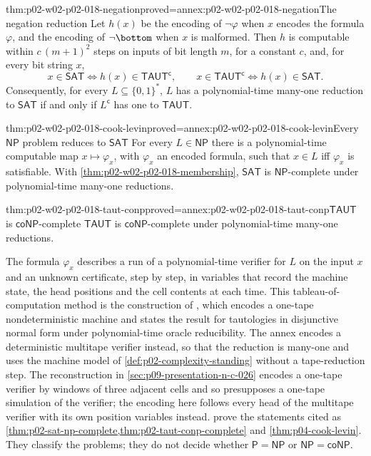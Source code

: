 \begin{hbtheorem}{thm:p02-w02-p02-018-negation}{proved=annex:p02-w02-p02-018-negation}{The negation reduction}
Let \(h(x)\) be the encoding of \(\neg\varphi\) when \(x\) encodes the formula
\(\varphi\), and the encoding of \(\neg\bottom\) when \(x\) is malformed.
Then \(h\) is computable within \(c\,(m+1)^{2}\) steps on inputs of bit
length \(m\), for a constant \(c\), and, for every bit string \(x\),
\[
 x\in\mathsf{SAT}\iff h(x)\in\mathsf{TAUT}^{\mathsf c},
 \qquad
 x\in\mathsf{TAUT}^{\mathsf c}\iff h(x)\in\mathsf{SAT}.
\]
Consequently, for every \(L\subseteq\{0,1\}^*\), \(L\) has a polynomial-time
many-one reduction to \(\mathsf{SAT}\) if and only if \(L^{\mathsf c}\) has one
to \(\mathsf{TAUT}\).
\end{hbtheorem}

\begin{hbtheorem}{thm:p02-w02-p02-018-cook-levin}{proved=annex:p02-w02-p02-018-cook-levin}{Every \(\mathsf{NP}\) problem reduces to \(\mathsf{SAT}\)}
For every \(L\in\mathsf{NP}\) there is a polynomial-time computable map
\(x\mapsto\varphi_x\), with \(\varphi_x\) an encoded formula, such that
\(x\in L\) iff \(\varphi_x\) is satisfiable.  With
\cref{thm:p02-w02-p02-018-membership}, \(\mathsf{SAT}\) is
\(\mathsf{NP}\)-complete under polynomial-time many-one reductions.
\end{hbtheorem}

\begin{hbcorollary}{thm:p02-w02-p02-018-taut-conp}{proved=annex:p02-w02-p02-018-taut-conp}{\(\mathsf{TAUT}\) is \(\mathsf{coNP}\)-complete}
\(\mathsf{TAUT}\) is \(\mathsf{coNP}\)-complete under polynomial-time
many-one reductions.
\end{hbcorollary}

The formula \(\varphi_x\) describes a run of a polynomial-time verifier for
\(L\) on the input \(x\) and an unknown certificate, step by step, in
variables that record the machine state, the head positions and the cell
contents at each time.  This tableau-of-computation method is the
construction of \textcite[p.~152, Theorem~1]{Cook1971}, which encodes a
one-tape nondeterministic machine and states the result for tautologies in
disjunctive normal form under polynomial-time oracle reducibility.  The
annex encodes a deterministic multitape verifier instead, so that the
reduction is many-one and uses the machine model of
\cref{def:p02-complexity-standing} without a tape-reduction step.  The
reconstruction in \cref{sec:p09-presentation-n-c-026} encodes a one-tape
verifier by windows of three adjacent cells and so presupposes a one-tape
simulation of the verifier; the encoding here follows every head of the
multitape verifier with its own position variables instead.
 prove the
statements cited as \cref{thm:p02-sat-np-complete,thm:p02-taut-conp-complete}
and \cref{thm:p04-cook-levin}.  They classify the problems; they do not decide
whether \(\mathsf P=\mathsf{NP}\) or \(\mathsf{NP}=\mathsf{coNP}\).

